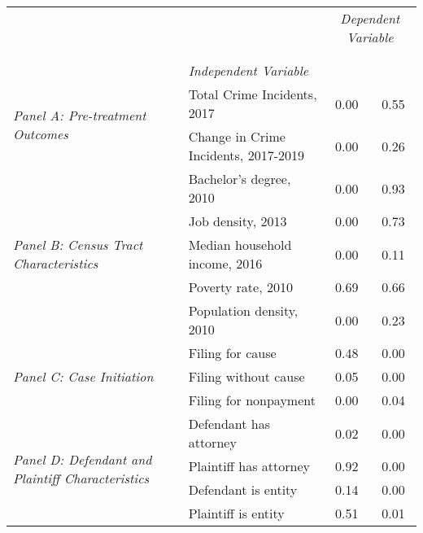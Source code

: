 \begin{tabular}{llcc}
\toprule
 &  & \multicolumn{2}{c}{\textit{Dependent Variable}} \\
\cline{3-4}
\\
 &  &  &  \\
 & \emph{Independent Variable} &  &  \\
\midrule
\multirow[c]{2}{3cm}{\textit{Panel A: Pre-treatment Outcomes}} & Total Crime Incidents, 2017 & 0.00 & 0.55 \\
 & Change in Crime Incidents, 2017-2019 & 0.00 & 0.26 \\
\cline{1-4}
\multirow[c]{5}{3cm}{\textit{Panel B: Census Tract Characteristics}} & Bachelor's degree, 2010 & 0.00 & 0.93 \\
 & Job density, 2013 & 0.00 & 0.73 \\
 & Median household income, 2016 & 0.00 & 0.11 \\
 & Poverty rate, 2010 & 0.69 & 0.66 \\
 & Population density, 2010 & 0.00 & 0.23 \\
\cline{1-4}
\multirow[c]{3}{3cm}{\textit{Panel C: Case Initiation}} & Filing for cause & 0.48 & 0.00 \\
 & Filing without cause & 0.05 & 0.00 \\
 & Filing for nonpayment & 0.00 & 0.04 \\
\cline{1-4}
\multirow[c]{4}{3cm}{\textit{Panel D: Defendant and Plaintiff Characteristics}} & Defendant has attorney & 0.02 & 0.00 \\
 & Plaintiff has attorney & 0.92 & 0.00 \\
 & Defendant is entity & 0.14 & 0.00 \\
 & Plaintiff is entity & 0.51 & 0.01 \\
\cline{1-4}
\bottomrule
\end{tabular}
